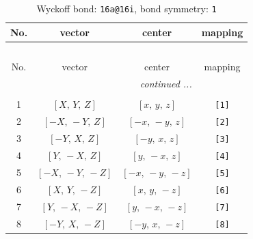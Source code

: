 \documentclass[fleqn,8pt]{jsarticle}
\begin{document}
\begin{longtable}{cccc}
\caption{Wyckoff bond: {\tt 16a@16i}, bond symmetry: {\tt 1}}
 \\
 \hline \hline
No. & vector & center & mapping \\ \hline \endfirsthead

\multicolumn{3}{l}{\tablename\ \thetable{}} \\
 \hline \hline
No. & vector & center & mapping \\ \hline \endhead

 \hline \hline
\multicolumn{3}{r}{\footnotesize\it continued ...} \\ \endfoot

 \hline \hline
\multicolumn{3}{r}{} \\ \endlastfoot

1 & $\left[ X,\, Y,\, Z \right]$ & $\left[ x,\, y,\, z \right]$ & {\tt [1]} \\ \hline
2 & $\left[ - X,\, - Y,\, Z \right]$ & $\left[ - x,\, - y,\, z \right]$ & {\tt [2]} \\ \hline
3 & $\left[ - Y,\, X,\, Z \right]$ & $\left[ - y,\, x,\, z \right]$ & {\tt [3]} \\ \hline
4 & $\left[ Y,\, - X,\, Z \right]$ & $\left[ y,\, - x,\, z \right]$ & {\tt [4]} \\ \hline
5 & $\left[ - X,\, - Y,\, - Z \right]$ & $\left[ - x,\, - y,\, - z \right]$ & {\tt [5]} \\ \hline
6 & $\left[ X,\, Y,\, - Z \right]$ & $\left[ x,\, y,\, - z \right]$ & {\tt [6]} \\ \hline
7 & $\left[ Y,\, - X,\, - Z \right]$ & $\left[ y,\, - x,\, - z \right]$ & {\tt [7]} \\ \hline
8 & $\left[ - Y,\, X,\, - Z \right]$ & $\left[ - y,\, x,\, - z \right]$ & {\tt [8]} \\
\end{longtable}
\end{document}
